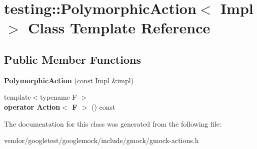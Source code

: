 \hypertarget{classtesting_1_1_polymorphic_action}{}\section{testing\+:\+:Polymorphic\+Action$<$ Impl $>$ Class Template Reference}
\label{classtesting_1_1_polymorphic_action}
\subsection*{Public Member Functions}
\begin{DoxyCompactItemize}
\item 
\mbox{\label{classtesting_1_1_polymorphic_action_a062e5a45ad61dcf8085b15cc882ca0ae}} 
{\bfseries Polymorphic\+Action} (const Impl \&impl)
\item 
\mbox{\label{classtesting_1_1_polymorphic_action_ac35461616cc15c06f1a2f9ee1c03fb8f}} 
{\footnotesize template$<$typename F $>$ }\\{\bfseries operator Action$<$ F $>$} () const
\end{DoxyCompactItemize}


The documentation for this class was generated from the following file\+:\begin{DoxyCompactItemize}
\item 
vendor/googletest/googlemock/include/gmock/gmock-\/actions.\+h\end{DoxyCompactItemize}
